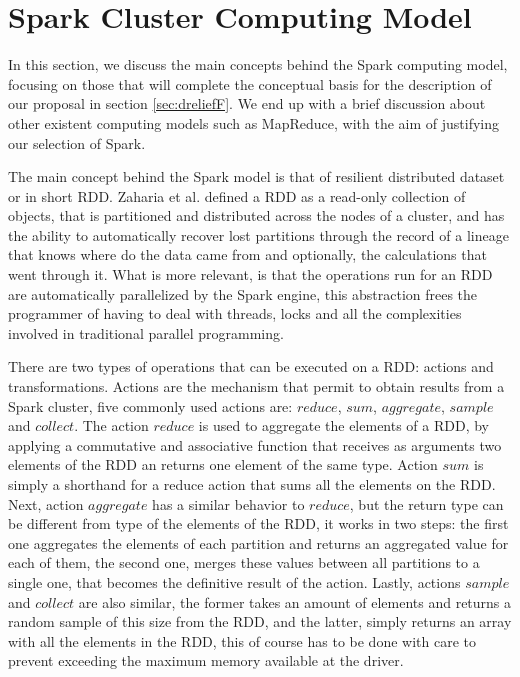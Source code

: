 \section{Spark Cluster Computing Model}

In this section, we discuss the main concepts behind the Spark computing model, focusing on those that will complete the conceptual basis for the description of our proposal in section \ref{sec:dreliefF}. We end up with a brief discussion about other existent computing models such as MapReduce, with the aim of justifying our selection of Spark. 

The main concept behind the Spark model is that of resilient distributed dataset or in short RDD. Zaharia et al. \cite{Zaharia2010,Zaharia2012} defined a RDD as a read-only collection of objects, that is partitioned and distributed across the nodes of a cluster, and has the ability to automatically recover lost partitions through the record of a lineage that knows where do the data came from and optionally, the calculations that went through it. What is more relevant, is that the operations run for an RDD are automatically parallelized by the Spark engine, this abstraction frees the programmer of having to deal with threads, locks and all the complexities involved in traditional parallel programming. 

There are two types of operations that can be executed on a RDD: actions and transformations. Actions are the mechanism that permit to obtain results from a Spark cluster, five commonly used actions are: $reduce$, $sum$, $aggregate$, $sample$ and $collect$. The action $reduce$ is used to aggregate the elements of a RDD, by applying a commutative and associative function that receives as arguments two elements of the RDD an returns one element of the same type. Action $sum$ is simply a shorthand for a reduce action that sums all the elements on the RDD. Next, action $aggregate$ has a similar behavior to $reduce$, but the return type can be different from type of the elements of the RDD, it works in two steps: the first one aggregates the elements of each partition and returns an aggregated value for each of them, the second one, merges these values between all partitions to a single one, that becomes the definitive result of the action. Lastly, actions $sample$ and $collect$ are also similar, the former takes an amount of elements and returns a random sample of this size from the RDD, and the latter, simply returns an array with all the elements in the RDD, this of course has to be done with care to prevent exceeding the maximum memory available at the driver.

